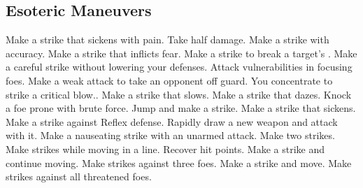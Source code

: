 
\small
\subsection{Esoteric Maneuvers}\label{Esoteric Maneuvers}
\begin{spelllist}
 Make a strike that sickens with pain.
 Take half damage.
 Make a strike with  accuracy.
 Make a strike that inflicts fear.
 Make a strike to break a target's .
 Make a careful strike without lowering your defenses.
 Attack vulnerabilities in focusing foes.
 Make a weak attack to take an opponent off guard.
 You concentrate to strike a critical blow..
 Make a strike that slows.
 Make a strike that dazes.
 Knock a foe prone with brute force.
 Jump and make a strike.
 Make a strike that sickens.
 Make a strike against Reflex defense.
 Rapidly draw a new weapon and attack with it.
 Make a nauseating strike with an unarmed attack.
 Make two strikes.
 Make strikes while moving in a line.
 Recover hit points.
 Make a strike and continue moving.
 Make strikes against three foes.
 Make a strike and move.
 Make strikes against all threatened foes.
\end{spelllist}



\small
